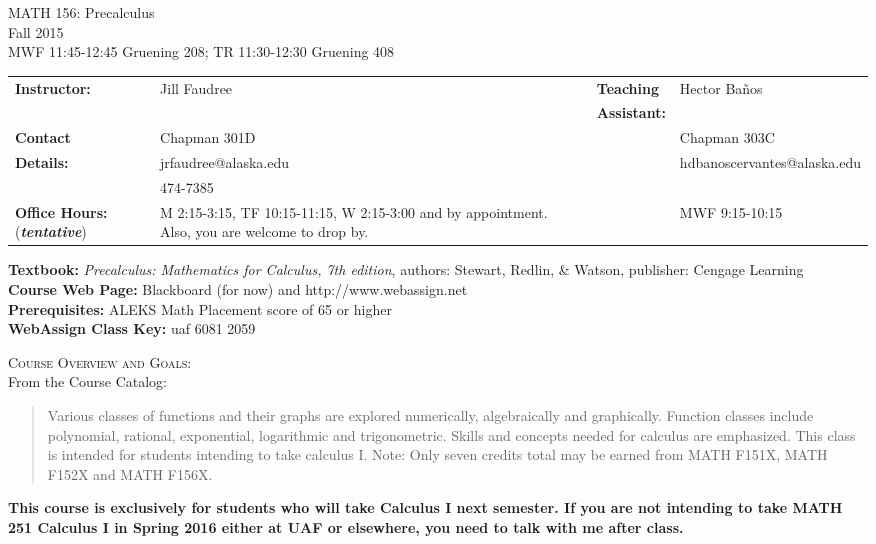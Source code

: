\documentclass[11pt]{article}
\begin{document}
\begin{center}MATH 156: Precalculus  \\ Fall 2015 \\ MWF 11:45-12:45 Gruening 208; TR 11:30-12:30 Gruening 408 
\end{center}

\hrulefill

\begin{tabular}{p{2.5cm}p{5cm}p{0.25cm}p{2.5cm}p{5cm}}
\textbf{Instructor:} &Jill Faudree&& \textbf{Teaching}&Hector Ba\~{n}os\\
&&&\textbf{Assistant:}&\\
\textbf{Contact}& Chapman 301D&&& Chapman 303C\\
\textbf{Details:}&jrfaudree@alaska.edu &&&hdbanoscervantes@alaska.edu \\
& 474-7385 &&\\
\textbf{Office Hours:} (\textbf{\emph{tentative}})&  M 2:15-3:15, TF 10:15-11:15, W 2:15-3:00 and by appointment. Also, you are welcome to drop by. &&& MWF 9:15-10:15\\
\end{tabular}

\textbf{Textbook:} \emph{Precalculus: Mathematics for Calculus, 7th edition}, authors: Stewart, Redlin, \& Watson, publisher: Cengage Learning\\
\textbf{Course Web Page:} Blackboard (for now) and http://www.webassign.net\\
\textbf{Prerequisites:} ALEKS Math Placement score of 65 or higher\\
\textbf{WebAssign Class Key:} uaf 6081 2059

\hrulefill

\textsc{Course Overview and Goals:}\\
 From the Course Catalog:
\begin{quote}
Various classes of functions and their graphs are explored numerically, algebraically and graphically. Function classes include polynomial, rational, exponential, logarithmic and trigonometric. Skills and concepts needed for calculus are emphasized. This class is intended for students intending to take calculus I. Note: Only seven credits total may be earned from MATH F151X, MATH F152X and MATH F156X.  \end{quote}

\textbf{This course is exclusively for students who will take Calculus I next semester. If you are not intending to take MATH 251 Calculus I in Spring 2016 either at UAF or elsewhere, you need to talk with me after class.}
\end{document}

